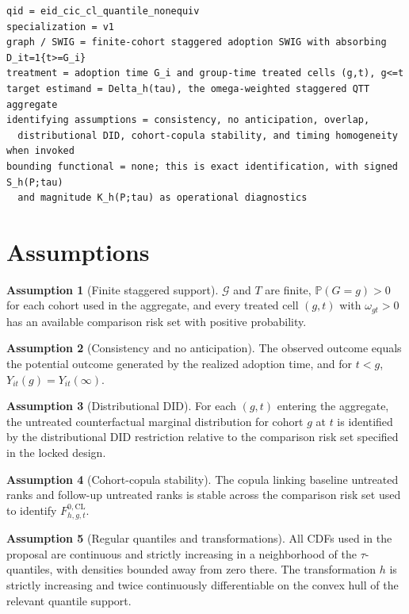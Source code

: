 \documentclass[11pt]{article}
\renewcommand{\Pr}{\mathbb{P}}
\theoremstyle{definition}
\newtheorem{assumption}{Assumption}
\theoremstyle{plain}
\theoremstyle{remark}
\begin{document}
\begin{verbatim}
qid = eid_cic_cl_quantile_nonequiv
specialization = v1
graph / SWIG = finite-cohort staggered adoption SWIG with absorbing D_it=1{t>=G_i}
treatment = adoption time G_i and group-time treated cells (g,t), g<=t
target estimand = Delta_h(tau), the omega-weighted staggered QTT aggregate
identifying assumptions = consistency, no anticipation, overlap,
  distributional DID, cohort-copula stability, and timing homogeneity when invoked
bounding functional = none; this is exact identification, with signed S_h(P;tau)
  and magnitude K_h(P;tau) as operational diagnostics
\end{verbatim}

\section{Assumptions}
\begin{assumption}[Finite staggered support]\label{ass:finite}
\(\mathcal G\) and \(T\) are finite, \(\Pr(G=g)>0\) for each cohort used in the
aggregate, and every treated cell \((g,t)\) with \(\omega_{gt}>0\) has an
available comparison risk set with positive probability.
\end{assumption}

\begin{assumption}[Consistency and no anticipation]\label{ass:consistency}
The observed outcome equals the potential outcome generated by the realized
adoption time, and for \(t<g\), \(Y_{it}(g)=Y_{it}(\infty)\).
\end{assumption}

\begin{assumption}[Distributional DID]\label{ass:ddid}
For each \((g,t)\) entering the aggregate, the untreated counterfactual marginal
distribution for cohort \(g\) at \(t\) is identified by the distributional DID
restriction relative to the comparison risk set specified in the locked design.
\end{assumption}

\begin{assumption}[Cohort-copula stability]\label{ass:copula}
The copula linking baseline untreated ranks and follow-up untreated ranks is
stable across the comparison risk set used to identify \(F^{0,\mathrm{CL}}_{h,g,t}\).
\end{assumption}

\begin{assumption}[Regular quantiles and transformations]\label{ass:regular}
All CDFs used in the proposal are continuous and strictly increasing in a
neighborhood of the \(\tau\)-quantiles, with densities bounded away from zero
there.  The transformation \(h\) is strictly increasing and twice continuously
differentiable on the convex hull of the relevant quantile support.
\end{assumption}
\end{document}
